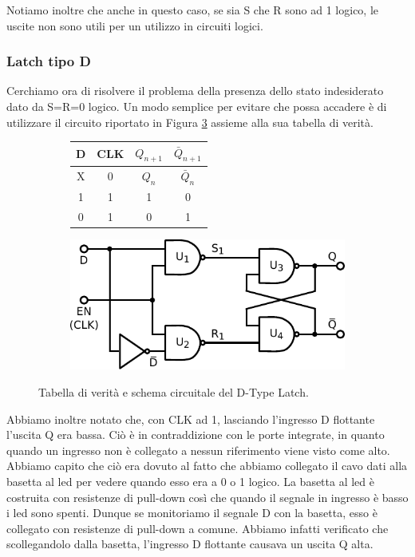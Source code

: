 Notiamo inoltre che anche in questo caso, se sia S che R sono ad 1 logico, le uscite non sono utili per un utilizzo in circuiti logici.

\subsubsection*{Latch tipo D}

Cerchiamo ora di risolvere il problema della presenza dello stato indesiderato dato da S=R=0 logico.
Un modo semplice per evitare che possa accadere è di utilizzare il circuito riportato in Figura \ref{cir11:D-type-latch} assieme alla sua tabella di verità.

\begin{figure}[htpc]
\centering
	\begin{subfigure}[hc]{.4\textwidth}
		\centering
		{\renewcommand{\arraystretch}{1.2}%
		\begin{tabular}{|c|c|c|c|}
		\hline
		D & CLK	& $Q_{n+1}$	& $\bar Q_{n+1}$  \\
		\hline
		X & 0   & $Q_n$		& $\bar Q_n$\\
		\hline
		1 & 1   & 1		& 0\\
		\hline
		0 & 1   & 0		& 1\\
		\hline
		\end{tabular}}
		\caption{}
		\label{tab11:Latch_D}
        \end{subfigure}
        \begin{subfigure}[hc]{.4\textwidth}
		\centering
		\includegraphics[width=.7\textwidth]{../E11/latex/D-type-latch.pdf}
		\caption{}
		\label{cir11:D-type-latch}
        \end{subfigure}
\caption{Tabella di verità e schema circuitale del D-Type Latch.}
\end{figure}

Abbiamo inoltre notato che, con CLK ad 1, lasciando l'ingresso D flottante l'uscita Q era bassa.
Ciò è in contraddizione con le porte integrate, in quanto quando un ingresso non è collegato a nessun riferimento viene visto come alto.
Abbiamo capito che ciò era dovuto al fatto che abbiamo collegato il cavo dati alla basetta al led per vedere quando esso era a 0 o 1 logico.
La basetta al led è costruita con resistenze di pull-down così che quando il segnale in ingresso è basso i led sono spenti.
Dunque se monitoriamo il segnale D con la basetta, esso è collegato con resistenze di pull-down a comune.
Abbiamo infatti verificato che scollegandolo dalla basetta, l'ingresso D flottante causava un uscita Q alta.

